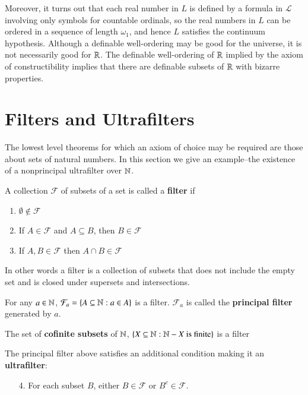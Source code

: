 \documentclass[12pt, a4paper, oneside, openright, titlepage]{book}
\begin{document}
Moreover, it turns out that each real number in $L$ is defined by a formula in $\mathcal{L}$ involving only symbols for countable ordinals, so the real numbers in $L$ can be ordered in a sequence of length $\omega_1$, and hence $L$ satisfies the continuum hypothesis. Although a definable well-ordering may be good for the universe, it is not necessarily good for $\mathbb R$. The definable well-ordering of $\mathbb R$ implied by the axiom of constructibility implies that there are definable subsets of $\mathbb R$ with bizarre properties.


\section{Filters and Ultrafilters}

The lowest level theorems for which an axiom of choice may be required are those about sets of natural numbers. In this section we give an example\---the existence of a nonprincipal ultrafilter over $\mathbb N$.

\begin{defn}
    A collection $\mathcal{F}$ of subsets of a set is called a \textbf{filter} if \begin{enumerate}
        \item $\emptyset \notin \mathcal{F}$
        \item If $A \in \mathcal{F}$ and $A \subseteq B$, then $B \in \mathcal{F}$
        \item If $A,B \in \mathcal{F}$ then $A\cap B \in \mathcal{F}$
    \end{enumerate}
\end{defn}
In other words a filter is a collection of subsets that does not include the empty set and is closed under supersets and intersections.

\begin{eg}
    For any $a \in \mathbb N$, $\mathcal{F}_a = \{A \subseteq \mathbb N:a \in A\}$ is a filter. $\mathcal{F}_a$ is called the \textbf{principal filter} generated by $a$.

    The set of \textbf{cofinite subsets} of $\mathbb N$, $\{X \subseteq \mathbb N:\mathbb N-X\text{ is finite}\}$ is a filter
\end{eg}

The principal filter above satisfies an additional condition making it an \textbf{ultrafilter}: \begin{enumerate}
    \item[4.] For each subset $B$, either $B \in \mathcal{F}$ or $B^c \in \mathcal{F}$.
\end{enumerate}
\end{document}
